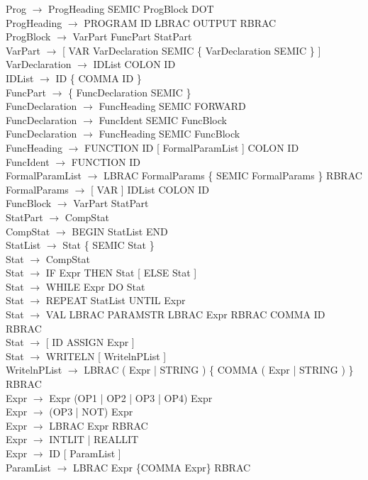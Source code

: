 \documentclass[12pt]{article}
\begin{document}
\noindent Prog $\rightarrow$ ProgHeading SEMIC ProgBlock DOT\\
ProgHeading $\rightarrow$ PROGRAM ID LBRAC OUTPUT RBRAC\\
ProgBlock $\rightarrow$ VarPart FuncPart StatPart\\
VarPart $\rightarrow$ [ VAR VarDeclaration SEMIC \{ VarDeclaration SEMIC \} ]\\
VarDeclaration $\rightarrow$ IDList COLON ID\\
IDList $\rightarrow$ ID \{ COMMA ID \}\\
FuncPart $\rightarrow$ \{ FuncDeclaration SEMIC \}\\
FuncDeclaration $\rightarrow$ FuncHeading SEMIC FORWARD\\
FuncDeclaration $\rightarrow$ FuncIdent SEMIC FuncBlock\\
FuncDeclaration $\rightarrow$ FuncHeading SEMIC FuncBlock\\
FuncHeading $\rightarrow$ FUNCTION ID [ FormalParamList ] COLON ID\\
FuncIdent $\rightarrow$ FUNCTION ID\\
FormalParamList $\rightarrow$ LBRAC FormalParams \{ SEMIC FormalParams \} RBRAC\\
FormalParams $\rightarrow$ [ VAR ] IDList COLON ID\\
FuncBlock $\rightarrow$ VarPart StatPart\\
StatPart $\rightarrow$ CompStat\\
CompStat $\rightarrow$ BEGIN StatList END\\
StatList $\rightarrow$ Stat \{ SEMIC Stat \}\\
Stat $\rightarrow$ CompStat\\
Stat $\rightarrow$ IF Expr THEN Stat [ ELSE Stat ]\\
Stat $\rightarrow$ WHILE Expr DO Stat\\
Stat $\rightarrow$ REPEAT StatList UNTIL Expr\\
Stat $\rightarrow$ VAL LBRAC PARAMSTR LBRAC Expr RBRAC COMMA ID RBRAC\\
Stat $\rightarrow$ [ ID ASSIGN Expr ]\\
Stat $\rightarrow$ WRITELN [ WritelnPList ]\\
WritelnPList $\rightarrow$ LBRAC ( Expr | STRING ) \{ COMMA ( Expr | STRING ) \} RBRAC\\
Expr $\rightarrow$ Expr (OP1 | OP2 | OP3 | OP4) Expr\\
Expr $\rightarrow$ (OP3 | NOT) Expr\\
Expr $\rightarrow$ LBRAC Expr RBRAC\\
Expr $\rightarrow$ INTLIT | REALLIT\\
Expr $\rightarrow$ ID [ ParamList ]\\
ParamList $\rightarrow$ LBRAC Expr \{COMMA Expr\} RBRAC\\
\end{document}
